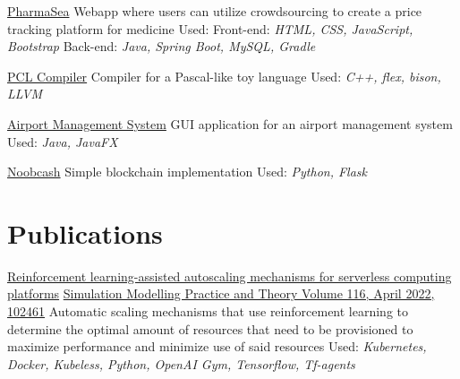 \documentclass[11pt,a4paper,sans]{moderncv} %
\begin{document}
\cventry{}
{\href{https://github.com/Nickgraviton/pharmasea}{PharmaSea}}
{\newline Webapp where users can utilize crowdsourcing to create a price tracking platform for medicine}
{\newline Used:
\newline Front-end: \emph{HTML, CSS, JavaScript, Bootstrap}
\newline Back-end: \emph{Java, Spring Boot, MySQL, Gradle}}{}{}

\cventry{}
{\href{https://github.com/Nickgraviton/pcl-compiler}{PCL Compiler}}
{\newline Compiler for a Pascal-like toy language}
{\newline Used: \emph{C++, flex, bison, LLVM}}{}{}

\cventry{}
{\href{https://github.com/Nickgraviton/airport-management-system}{Airport Management System}}
{\newline GUI application for an airport management system}
{\newline Used: \emph{Java, JavaFX}}{}{}

\cventry{}
{\href{https://github.com/Nickgraviton/noobcash}{Noobcash}}
{\newline Simple blockchain implementation}
{\newline Used: \emph{Python, Flask}}{}{}


\section{Publications}

{\href{https://gitlab.com/netmode/k8s-rl-autoscaler}{Reinforcement learning-assisted autoscaling mechanisms for serverless computing platforms}}
{\href{https://doi.org/10.1016/j.simpat.2021.102461}{Simulation Modelling Practice and Theory Volume 116, April 2022, 102461}}
{\newline Automatic scaling mechanisms that use reinforcement learning to determine the optimal amount of resources that need to be provisioned to maximize performance and minimize use of said resources}
{\newline Used: \emph{Kubernetes, Docker, Kubeless, Python, OpenAI Gym, Tensorflow, Tf-agents}}{}
\end{document}
